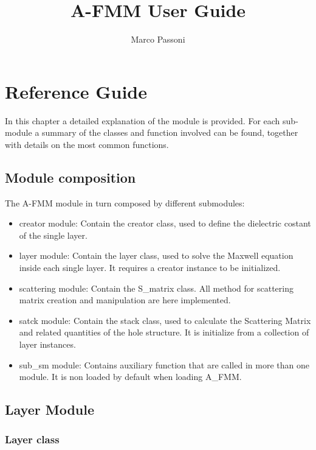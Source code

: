 \documentclass[a4paper,10pt]{report}
\title{A-FMM User Guide}
\author{Marco Passoni}
\date{}
\begin{document}
\maketitle

\chapter{Reference Guide}
In this chapter a detailed explanation of the module is provided. For each sub-module a summary of the classes and function involved can be found, together with details on the most common functions.
\section{Module composition}
The A-FMM module in turn composed by different submodules:
\begin{itemize}
\item creator module: Contain the creator class, used to define the dielectric costant of the single layer.   
\item layer module: Contain the layer class, used to solve the Maxwell equation inside each single layer. It requires a creator instance to be initialized.
\item scattering module: Contain the S\_matrix class. All method for scattering matrix creation and manipulation are here implemented.  
\item satck module: Contain the stack class, used to calculate the Scattering Matrix and related quantities of the hole structure. It is initialize from a collection of layer instances.
\item sub\_sm module: Contains auxiliary function that are called in more than one module. It is non loaded by default when loading A\_FMM.
\end{itemize}


\section{Layer Module}
\subsection{Layer class}
\end{document}
